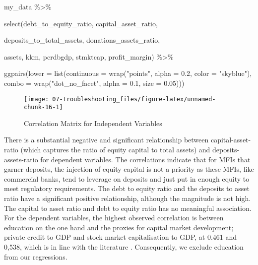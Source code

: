 \documentclass[a4paper,nobind]{templates/ociamthesis}
\newenvironment{Shaded}{\begin{snugshade}}{\end{snugshade}}
\newcommand{\AttributeTok}[1]{\textcolor[rgb]{0.77,0.63,0.00}{#1}}
\newcommand{\FloatTok}[1]{\textcolor[rgb]{0.00,0.00,0.81}{#1}}
\newcommand{\FunctionTok}[1]{\textcolor[rgb]{0.00,0.00,0.00}{#1}}
\newcommand{\NormalTok}[1]{#1}
\newcommand{\SpecialCharTok}[1]{\textcolor[rgb]{0.00,0.00,0.00}{#1}}
\newcommand{\StringTok}[1]{\textcolor[rgb]{0.31,0.60,0.02}{#1}}
\renewenvironment{Shaded}
{
  \vspace{10pt}%
  \begin{snugshade}%
}{%
  \end{snugshade}%
  \vspace{8pt}%
}
\begin{document}
\begin{landscape}

\begin{Shaded}
\begin{Highlighting}[]
\NormalTok{my\_data }\SpecialCharTok{\%\textgreater{}\%} 
  
  \FunctionTok{select}\NormalTok{(debt\_to\_equity\_ratio, capital\_asset\_ratio, }
         
\NormalTok{         deposits\_to\_total\_assets, donations\_assets\_ratio, }
         
\NormalTok{         assets, kkm, pcrdbgdp, stmktcap, profit\_margin) }\SpecialCharTok{\%\textgreater{}\%} 
  
 \FunctionTok{ggpairs}\NormalTok{(}\AttributeTok{lower =} \FunctionTok{list}\NormalTok{(}\AttributeTok{continuous =} \FunctionTok{wrap}\NormalTok{(}\StringTok{"points"}\NormalTok{, }\AttributeTok{alpha =} \FloatTok{0.2}\NormalTok{, }
          \AttributeTok{color =} \StringTok{"skyblue"}\NormalTok{), }
          \AttributeTok{combo =} \FunctionTok{wrap}\NormalTok{(}\StringTok{"dot\_no\_facet"}\NormalTok{, }\AttributeTok{alpha =} \FloatTok{0.1}\NormalTok{, }\AttributeTok{size =} \FloatTok{0.05}\NormalTok{)))}
\end{Highlighting}
\end{Shaded}

\begin{figure}

{\centering \texttt{[image: 07-troubleshooting\_files/figure-latex/unnamed-chunk-16-1]} 

}

\caption{Correlation Matrix for Independent Variables}\label{fig:unnamed-chunk-16}
\end{figure}

\end{landscape}

There is a substantial negative and significant relationship between capital-asset-ratio (which captures the ratio of equity capital to total assets) and deposits-assets-ratio for dependent variables. The correlations indicate that for MFIs that garner deposits, the injection of equity capital is not a priority as these MFIs, like commercial banks, tend to leverage on deposits and just put in enough equity to meet regulatory requirements. The debt to equity ratio and the deposits to asset ratio have a significant positive relationship, although the magnitude is not high. The capital to asset ratio and debt to equity ratio has no meaningful association. For the dependent variables, the highest observed correlation is between education on the one hand and the proxies for capital market development; private credit to GDP and stock market capitalisation to GDP, at 0.461 and 0,538, which is in line with the literature \autocite{allen2013resolving,allen2014african}. Consequently, we exclude education from our regressions.
\end{document}
